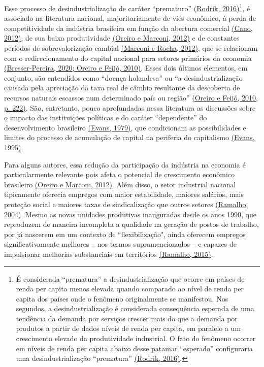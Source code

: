 Esse processo de desindustrialização de caráter ``prematuro''
\href{https://www.zotero.org/google-docs/?CaOWo7}{(Rodrik,
2016)}\footnote{É considerada ``prematura'' a desindustrialização que
  ocorre em países de renda per capita menos elevada quando comparado ao
  nível de renda per capita dos países onde o fenômeno originalmente se
  manifestou. Nos segundos, a desindustrialização é considerada
  consequência esperada de uma tendência da demanda por serviços crescer
  mais do que a demanda por produtos a partir de dados níveis de renda
  per capita, em paralelo a um crescimento elevado da produtividade
  industrial. O fato do fenômeno ocorrer em níveis de renda per capita
  abaixo desse patamar ``esperado'' configuraria uma desindustrialização
  ``prematura''
  \href{https://www.zotero.org/google-docs/?js82Qa}{(Rodrik, 2016)}.}, é
associado na literatura nacional, majoritariamente de viés econômico, à
perda de competitividade da indústria brasileira em função da abertura
comercial \href{https://www.zotero.org/google-docs/?IgPcre}{(Cano,
2012)}, de sua baixa produtividade
\href{https://www.zotero.org/google-docs/?ETIj2z}{(Oreiro e Marconi,
2012)} e de constantes períodos de sobrevalorização cambial
\href{https://www.zotero.org/google-docs/?1ibNIt}{(Marconi e Rocha,
2012)}, que se relacionam com o redirecionamento do capital nacional
para setores primários da economia
\href{https://www.zotero.org/google-docs/?PD1Cx6}{(Bresser-Pereira,
2020; Oreiro e Feijó, 2010)}. Esses dois últimos elementos, em conjunto,
são entendidos como ``doença holandesa'' ou ``a desindustrialização
causada pela apreciação da taxa real de câmbio resultante da descoberta
de recursos naturais escassos num determinado país ou região''
\href{https://www.zotero.org/google-docs/?7SQuPc}{(Oreiro e Feijó, 2010,
p. 222)}. São, entretanto, pouco aprofundadas nessa literatura as
discussões sobre o impacto das instituições políticas e do caráter
``dependente'' do desenvolvimento brasileiro
\href{https://www.zotero.org/google-docs/?1XbSAc}{(Evans, 1979)}, que
condicionam as possibilidades e limites do processo de acumulação de
capital na periferia do capitalismo
\href{https://www.zotero.org/google-docs/?Bfmt8N}{(Evans, 1995)}.

Para alguns autores, essa redução da participação da indústria na
economia é particularmente relevante pois afeta o potencial de
crescimento econômico brasileiro
\href{https://www.zotero.org/google-docs/?dCuzii}{(Oreiro e Marconi,
2012)}. Além disso, o setor industrial nacional tipicamente oferecia
empregos com maior estabilidade, maiores salários, mais proteção social
e maiores taxas de sindicalização que outros setores
\href{https://www.zotero.org/google-docs/?8bSstM}{(Ramalho, 2004)}.
Mesmo as novas unidades produtivas inauguradas desde os anos 1990, que
reproduzem de maneira incompleta a qualidade na geração de postos de
trabalho, por já nascerem em um contexto de ``flexibilização", ainda
oferecem empregos significativamente melhores -- nos termos
supramencionados -- e capazes de impulsionar melhorias substanciais em
territórios \href{https://www.zotero.org/google-docs/?UbZXip}{(Ramalho,
2015)}.

